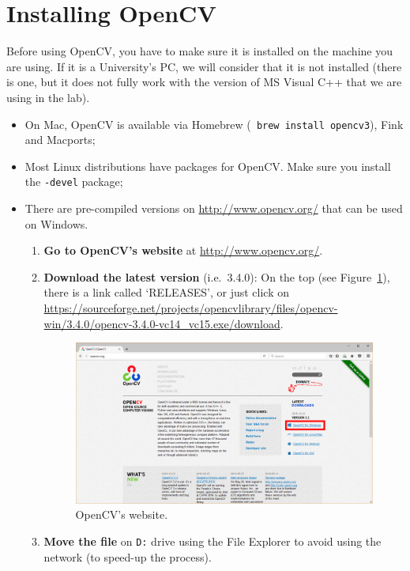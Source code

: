 \documentclass[english,a4paper,12pt,oneside]{article}
\begin{document}
\section{Installing OpenCV}
\label{sec:Installing OpenCV}
Before using OpenCV, you have to make sure it is installed on the machine you are using. 
If it is a University's PC, we will consider that it is not installed (there is one, but it does not fully work with the version of MS Visual C++ that we are using in the lab). 
\begin{itemize}
	\item On Mac, OpenCV is available via Homebrew (\verb+ brew install opencv3+), Fink and Macports;
 \item Most Linux distributions have packages for OpenCV. Make sure you install the \verb+-devel+ package;
 \item There are pre-compiled versions on \url{http://www.opencv.org/} that can be used on Windows. 
	 \begin{enumerate}
	\item \textbf{Go to OpenCV's website} at \url{http://www.opencv.org/}. 
	\item \textbf{Download the latest version} (i.e.~3.4.0): On the top (see Figure~\ref{fig:main_page}), there is a link called `RELEASES', or just click on \url{https://sourceforge.net/projects/opencvlibrary/files/opencv-win/3.4.0/opencv-3.4.0-vc14_vc15.exe/download}. 
		\begin{figure}[tbp]
			\centering
			\includegraphics[width=\textwidth]{opencv_mainpage.png}
			\caption{\label{fig:main_page}OpenCV's website.}
		\end{figure}
	\item \textbf{Move the file} on \verb+D:+ drive using the File Explorer to avoid using the network (to speed-up the process). 

\end{enumerate}
\end{itemize}
\end{document}
